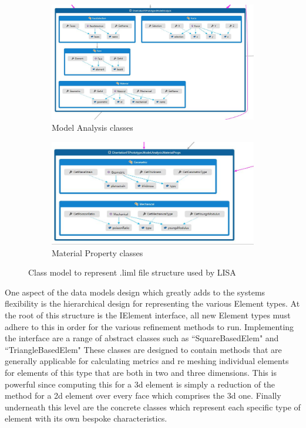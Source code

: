 \begin{figure}
\centering
\begin{subfigure}{.5\textwidth}
  \centering
  \includegraphics[width=0.9\linewidth]{../Graphics/DissoFEProto-ModelAnalysis.jpg}
  \caption{Model Analysis classes}
  \label{fig:sub1}
\end{subfigure}%
\begin{subfigure}{.5\textwidth}
  \centering
  \includegraphics[width=0.9\linewidth]{../Graphics/DissoFEProto-MaterialProps.jpg}
  \caption{Material Property classes}
  \label{fig:sub2}
\end{subfigure}
\label{fig:test}
\caption{Class model to represent .liml file structure used by LISA}
\end{figure}

\noindent
One aspect of the data models design which greatly adds to the systems flexibility is the hierarchical design for representing the various Element types. At the root of this structure is the IElement interface, all new Element types must adhere to this in order for the various refinement methods to run. Implementing the interface are a range of abstract classes such as ``SquareBasedElem" and ``TriangleBasedElem" These classes are designed to contain methods that are generally applicable for calculating metrics and re meshing individual elements for elements of this type that are both in two and three dimensions. This is powerful since computing this for a 3d element is simply a reduction of the method for a 2d element over every face which comprises the 3d one. Finally underneath this level are the concrete classes which represent each specific type of element with its own bespoke characteristics. \\ 

